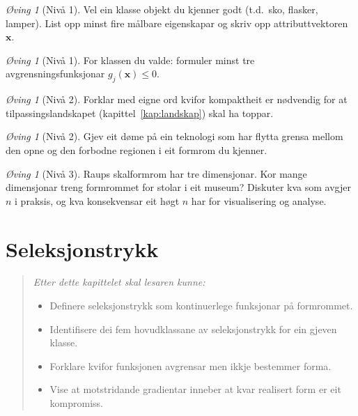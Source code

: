 \documentclass[10pt]{book}
\theoremstyle{definition}
\theoremstyle{plain}
\theoremstyle{remark}
\newtheorem{exercise}[definisjon]{\O{}ving}
\begin{document}
\begin{exercise}[Niv\aa{} 1]\label{ex:1.1}
Vel ein klasse objekt du kjenner godt (t.d.\ sko, flasker, lamper). List opp minst fire m\aa lbare eigenskapar og skriv opp attributtvektoren $\bm{x}$.
\end{exercise}

\begin{exercise}[Niv\aa{} 1]\label{ex:1.2}
For klassen du valde: formuler minst tre avgrensningsfunksjonar $g_j(\bm{x}) \leq 0$.
\end{exercise}

\begin{exercise}[Niv\aa{} 2]\label{ex:1.3}
Forklar med eigne ord kvifor kompaktheit er n\o dvendig for at tilpassingslandskapet (kapittel~\ref{kap:landskap}) skal ha toppar.
\end{exercise}

\begin{exercise}[Niv\aa{} 2]\label{ex:1.4}
Gjev eit d\o me p\aa{} ein teknologi som har flytta grensa mellom den opne og den forbodne regionen i eit formrom du kjenner.
\end{exercise}

\begin{exercise}[Niv\aa{} 3]\label{ex:1.5}
Raups skalformrom har tre dimensjonar. Kor mange dimensjonar treng formrommet for stolar i eit museum? Diskuter kva som avgjer $n$ i praksis, og kva konsekvensar eit h\o gt $n$ har for visualisering og analyse.
\end{exercise}


\chapter{Seleksjonstrykk}\label{kap:seleksjon}

\begin{quote}\itshape
Etter dette kapittelet skal lesaren kunne:
\begin{itemize}[nosep]
\item Definere seleksjonstrykk som kontinuerlege funksjonar p\aa{} formrommet.
\item Identifisere dei fem hovudklassane av seleksjonstrykk for ein gjeven klasse.
\item Forklare kvifor funksjonen avgrensar men ikkje bestemmer forma.
\item Vise at motstridande gradientar inneber at kvar realisert form er eit kompromiss.
\end{itemize}
\end{quote}
\end{document}
